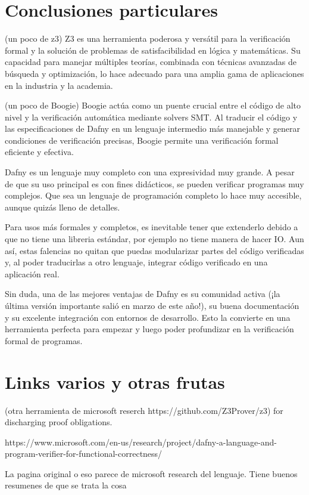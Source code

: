 \documentclass[runningheads]{llncs}
\begin{document}
\section{Conclusiones particulares}

(un poco de z3)
Z3 es una herramienta poderosa y versátil para la verificación formal y la solución de problemas de satisfacibilidad en lógica y matemáticas. 
Su capacidad para manejar múltiples teorías, combinada con técnicas avanzadas de búsqueda y optimización, 
lo hace adecuado para una amplia gama de aplicaciones en la industria y la academia.

(un poco de Boogie)
Boogie actúa como un puente crucial entre el código de alto nivel y la verificación automática mediante solvers SMT. 
Al traducir el código y las especificaciones de Dafny en un lenguaje intermedio más manejable y generar condiciones de verificación precisas, 
Boogie permite una verificación formal eficiente y efectiva.

Dafny es un lenguaje muy completo con una expresividad muy grande. A pesar de que su uso principal es con fines didácticos, se pueden verificar programas muy complejos. Que sea un lenguaje de programación completo lo hace muy accesible, aunque quizás lleno de detalles.

Para usos más formales y completos, es inevitable tener que extenderlo debido a que no tiene una libreria estándar, por ejemplo no tiene manera de hacer IO.
Aun así, estas falencias no quitan que puedas modularizar partes del código verificadas y, al poder traducirlas a otro lenguaje, integrar código verificado en una aplicación real.

Sin duda, una de las mejores ventajas de Dafny es su comunidad activa (¡la última versión importante salió en marzo de este año!), su buena documentación y su excelente integración con entornos de desarrollo. Esto la convierte en una herramienta perfecta para empezar y luego poder profundizar en la verificación formal de programas.
\section{Links varios y otras frutas}
(otra herramienta de microsoft reserch https://github.com/Z3Prover/z3) for discharging proof obligations.

https://www.microsoft.com/en-us/research/project/dafny-a-language-and-program-verifier-for-functional-correctness/

La pagina original o eso parece de microsoft research del lenguaje. Tiene buenos resumenes de que se trata la cosa
\end{document}
